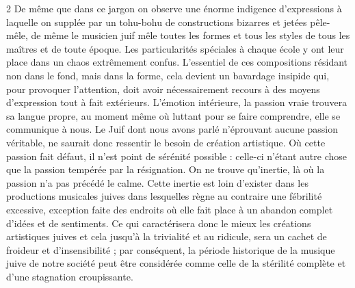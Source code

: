 \documentclass[a4paper,12pt]{article}
\begin{document}
\begin{paracol}{2}
         {De même que dans ce jargon on observe une énorme indigence d’expressions à laquelle on supplée par un tohu-bohu de constructions bizarres et jetées pêle-mêle, de même le musicien juif mêle toutes les formes et tous les styles de tous les maîtres et de toute époque. Les particularités spéciales à chaque école y ont leur place dans un chaos extrêmement confus. L’essentiel de ces compositions résidant non dans le fond, mais dans la forme, cela devient un bavardage insipide qui, pour provoquer l’attention, doit avoir nécessairement recours à des moyens d’expression tout à fait extérieurs. L’émotion intérieure, la passion vraie trouvera sa langue propre, au moment même où luttant pour se faire comprendre, elle se communique à nous. Le Juif dont nous avons parlé n’éprouvant aucune passion véritable, ne saurait donc ressentir le besoin de création artistique. Où cette passion fait défaut, il n’est point de sérénité possible : celle-ci n’étant autre chose que la passion tempérée par la résignation. On ne trouve qu’inertie, là où la passion n’a pas précédé le calme. Cette inertie est loin d’exister dans les productions musicales juives dans lesquelles règne au contraire une fébrilité excessive, exception faite des endroits où elle fait place à un abandon complet d’idées et de sentiments. Ce qui caractérisera donc le mieux les créations artistiques juives et cela jusqu’à la trivialité et au ridicule, sera un cachet de froideur et d’insensibilité ; par conséquent, la période historique de la musique juive de notre société peut être considérée comme celle de la stérilité complète et d’une stagnation croupissante.}

\end{paracol}
\end{document}
